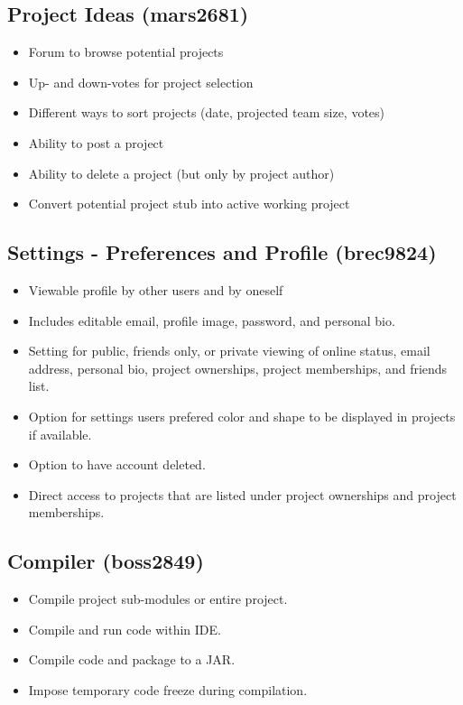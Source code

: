 \documentclass[11pt]{report}
\begin{document}
    \subsection{Project Ideas (mars2681)}
        \begin{itemize}
            \item Forum to browse potential projects
            \item Up- and down-votes for project selection
            \item Different ways to sort projects (date, projected team size, votes)
            \item Ability to post a project
            \item Ability to delete a project (but only by project author)
            \item Convert potential project stub into active working project 
        \end{itemize}
    \subsection{Settings - Preferences and Profile (brec9824)}
        \begin{itemize}
            \item Viewable profile by other users and by oneself
            \item Includes editable email, profile image, password, and personal bio.
            \item Setting for public, friends only, or private viewing of online status, email address, personal bio, project ownerships, project memberships, and friends list.
            \item Option for settings users prefered color and shape to be displayed in projects if available.
            \item Option to have account deleted.
        	\item Direct access to projects that are listed under project ownerships and project memberships.
        \end{itemize}
    \subsection{Compiler (boss2849)}
        \begin{itemize}
            \item Compile project sub-modules or entire project.
            \item Compile and run code within IDE.
            \item Compile code and package to a JAR.
            \item Impose temporary code freeze during compilation.
        \end{itemize}
\end{document}
